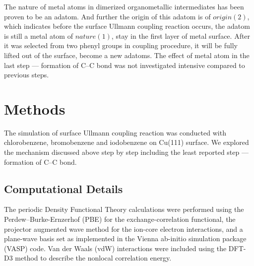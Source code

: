 \documentclass[%
 reprint,
 amsmath,amssymb,
 aps,
prb,
]{revtex4-2}
\begin{document}
The nature of metal atoms in dimerized organometallic intermediates has been proven to be an adatom. And further the origin of this adatom is of $origin(2)$, which indicates before the surface Ullmann coupling reaction occurs, the adatom is still a metal atom of $nature(1)$, stay in the first layer of metal surface. After it was selected from two phenyl groups in coupling procedure, it will be fully lifted out of the surface, become a new adatoms. The effect of metal atom in the last step --- formation of C--C bond was not investigated intensive compared to previous steps.


\section{Methods}

The simulation of surface Ullmann coupling reaction was conducted with chlorobenzene, bromobenzene and iodobenzene on Cu(111) surface. We explored the mechanism discussed above step by step including the least reported step --- formation of C--C bond.

\subsection{Computational Details}

The periodic Density Functional Theory calculations were performed using the Perdew–Burke-Ernzerhof (PBE) for the exchange-correlation functional, the projector augmented wave method for the ion-core electron interactions, and a plane-wave basis set as implemented in the Vienna ab-initio simulation package (VASP) code. Van der Waals (vdW) interactions were included using the DFT-D3 method to describe the nonlocal correlation energy. 
\end{document}
